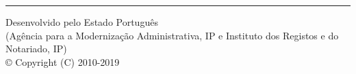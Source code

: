 \documentclass[
  $if(fontsize)$
    $fontsize$,
  $endif$
  $if(lang)$
    $babel-lang$,
  $endif$
  $if(papersize)$
    $papersize$paper,
  $endif$
  $for(classoption)$
    $classoption$$sep$,
  $endfor$]{article}
\let\OldRule\rule
\renewcommand{\rule}[2]{\OldRule{\linewidth}{#2}}
\begin{document}
\myRule{\linewidth}{0.2pt}\par
\myRule{\linewidth}{0.2pt}\par
\myRule{\linewidth}{0.2pt}\par
\myRule{\linewidth}{0.2pt}\par
\myRule{\linewidth}{0.2pt}\par
\myRule{\linewidth}{0.2pt}\par
\myRule{\linewidth}{0.2pt}\par
\myRule{\linewidth}{0.2pt}\par
\myRule{\linewidth}{0.2pt}\par
\myRule{\linewidth}{0.2pt}\par
\myRule{\linewidth}{0.2pt}\par
\myRule{\linewidth}{0.2pt}\par
\myRule{\linewidth}{0.2pt}\par
\myRule{\linewidth}{0.2pt}\par
\myRule{\linewidth}{0.2pt}\par
\myRule{\linewidth}{0.2pt}\par
\myRule{\linewidth}{0.2pt}\par
\myRule{\linewidth}{0.2pt}\par
\myRule{\linewidth}{0.2pt}\par
\myRule{\linewidth}{0.2pt}\par

\makeatletter
\let\old@rule\@rule
\def\@rule[#1]#2#3{\textcolor{black}{\old@rule[#1]{#2}{#3}}}
\makeatother

\vspace*{\fill}
\rule{\linewidth}{0.2pt}
Desenvolvido pelo Estado Português\\
(Agência para a Modernização Administrativa, IP e Instituto dos Registos e do Notariado, IP)\\
© Copyright (C) 2010-2019
\end{document}
